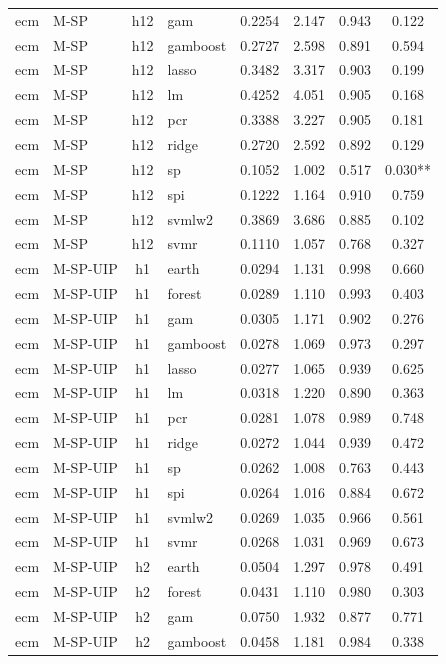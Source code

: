 \begin{ThreePartTable}
\begin{longtable}[t]{llclcccc}
ecm & M-SP & h12 & gam & 0.2254 & 2.147 & 0.943 & 0.122\\
ecm & M-SP & h12 & gamboost & 0.2727 & 2.598 & 0.891 & 0.594\\
ecm & M-SP & h12 & lasso & 0.3482 & 3.317 & 0.903 & 0.199\\
ecm & M-SP & h12 & lm & 0.4252 & 4.051 & 0.905 & 0.168\\
ecm & M-SP & h12 & pcr & 0.3388 & 3.227 & 0.905 & 0.181\\
ecm & M-SP & h12 & ridge & 0.2720 & 2.592 & 0.892 & 0.129\\
ecm & M-SP & h12 & sp & 0.1052 & 1.002 & 0.517 & 0.030**\\
ecm & M-SP & h12 & spi & 0.1222 & 1.164 & 0.910 & 0.759\\
ecm & M-SP & h12 & svmlw2 & 0.3869 & 3.686 & 0.885 & 0.102\\
ecm & M-SP & h12 & svmr & 0.1110 & 1.057 & 0.768 & 0.327\\
\addlinespace
ecm & M-SP-UIP & h1 & earth & 0.0294 & 1.131 & 0.998 & 0.660\\
ecm & M-SP-UIP & h1 & forest & 0.0289 & 1.110 & 0.993 & 0.403\\
ecm & M-SP-UIP & h1 & gam & 0.0305 & 1.171 & 0.902 & 0.276\\
ecm & M-SP-UIP & h1 & gamboost & 0.0278 & 1.069 & 0.973 & 0.297\\
ecm & M-SP-UIP & h1 & lasso & 0.0277 & 1.065 & 0.939 & 0.625\\
ecm & M-SP-UIP & h1 & lm & 0.0318 & 1.220 & 0.890 & 0.363\\
ecm & M-SP-UIP & h1 & pcr & 0.0281 & 1.078 & 0.989 & 0.748\\
ecm & M-SP-UIP & h1 & ridge & 0.0272 & 1.044 & 0.939 & 0.472\\
ecm & M-SP-UIP & h1 & sp & 0.0262 & 1.008 & 0.763 & 0.443\\
ecm & M-SP-UIP & h1 & spi & 0.0264 & 1.016 & 0.884 & 0.672\\
ecm & M-SP-UIP & h1 & svmlw2 & 0.0269 & 1.035 & 0.966 & 0.561\\
ecm & M-SP-UIP & h1 & svmr & 0.0268 & 1.031 & 0.969 & 0.673\\
\addlinespace
ecm & M-SP-UIP & h2 & earth & 0.0504 & 1.297 & 0.978 & 0.491\\
ecm & M-SP-UIP & h2 & forest & 0.0431 & 1.110 & 0.980 & 0.303\\
ecm & M-SP-UIP & h2 & gam & 0.0750 & 1.932 & 0.877 & 0.771\\
ecm & M-SP-UIP & h2 & gamboost & 0.0458 & 1.181 & 0.984 & 0.338\\

\end{longtable}
\end{ThreePartTable}
